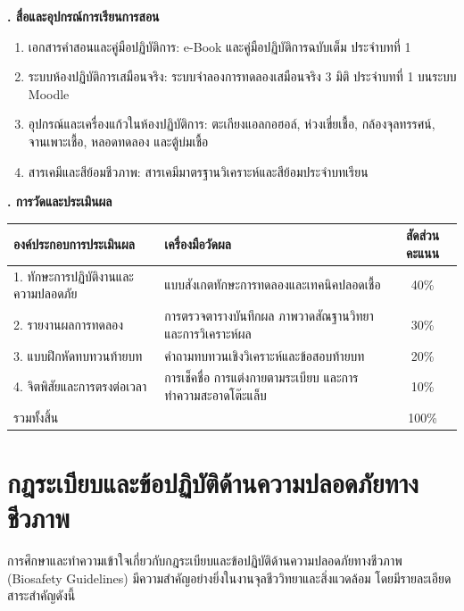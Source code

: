 \noindent\textbf{. สื่อและอุปกรณ์การเรียนการสอน}

\begin{enumerate}
    \item เอกสารคำสอนและคู่มือปฏิบัติการ: e-Book และคู่มือปฏิบัติการฉบับเต็ม ประจำบทที่ 1
    \item ระบบห้องปฏิบัติการเสมือนจริง: ระบบจำลองการทดลองเสมือนจริง 3 มิติ ประจำบทที่ 1 บนระบบ Moodle
    \item อุปกรณ์และเครื่องแก้วในห้องปฏิบัติการ: ตะเกียงแอลกอฮอล์, ห่วงเขี่ยเชื้อ, กล้องจุลทรรศน์, จานเพาะเชื้อ, หลอดทดลอง และตู้บ่มเชื้อ
    \item สารเคมีและสีย้อมชีวภาพ: สารเคมีมาตรฐานวิเคราะห์และสีย้อมประจำบทเรียน
\end{enumerate}

\noindent\textbf{. การวัดและประเมินผล}

\begin{table}[H]
\centering\small
\begin{tabularx}{\textwidth}{p{} p{} c}
\toprule
\textbf{องค์ประกอบการประเมินผล} & \textbf{เครื่องมือวัดผล} & \textbf{สัดส่วนคะแนน} \\
\midrule
1. ทักษะการปฏิบัติงานและความปลอดภัย & แบบสังเกตทักษะการทดลองและเทคนิคปลอดเชื้อ & 40\% \\
2. รายงานผลการทดลอง & การตรวจตารางบันทึกผล ภาพวาดสัณฐานวิทยา และการวิเคราะห์ผล & 30\% \\
3. แบบฝึกหัดทบทวนท้ายบท & คำถามทบทวนเชิงวิเคราะห์และข้อสอบท้ายบท & 20\% \\
4. จิตพิสัยและการตรงต่อเวลา & การเช็คชื่อ การแต่งกายตามระเบียบ และการทำความสะอาดโต๊ะแล็บ & 10\% \\
รวมทั้งสิ้น &  & 100\% \\
\bottomrule
\end{tabularx}
\end{table}

\newpage


\section{กฎระเบียบและข้อปฏิบัติด้านความปลอดภัยทางชีวภาพ}

การศึกษาและทำความเข้าใจเกี่ยวกับกฎระเบียบและข้อปฏิบัติด้านความปลอดภัยทางชีวภาพ (Biosafety Guidelines) มีความสำคัญอย่างยิ่งในงานจุลชีววิทยาและสิ่งแวดล้อม โดยมีรายละเอียดสาระสำคัญดังนี้

